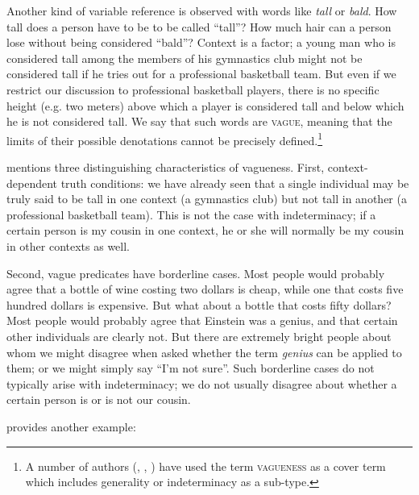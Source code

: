 Another kind of variable reference is observed with words like \textit{tall} or \textit{bald}. How tall does a person have to be to be called “tall”? How much hair can a person lose without being considered “bald”? Context is a factor; a young man who is considered tall among the members of his gymnastics club might not be considered tall if he tries out for a professional basketball team. But even if we restrict our discussion to professional basketball players, there is no specific height (e.g. two meters) above which a player is considered tall and below which he is not considered tall. We say that such words are \textsc{vague}, meaning that the limits of their possible denotations cannot be precisely defined.\footnote{A number of authors (\citealt{Kempson1977}, \citealt{Lakoff1970}, \citealt{Tuggy1993}) have used the term \textsc{vagueness} as a cover term which includes generality or indeterminacy as a sub-type.}



\citet{Kennedy2011} mentions three distinguishing characteristics of vagueness. First, context-dependent truth conditions: we have already seen that a single individual may be truly said to be tall in one context (a gymnastics club) but not tall in another (a professional basketball team). This is not the case with indeterminacy; if a certain person is my cousin in one context, he or she will normally be my cousin in other contexts as well.



Second, vague predicates have borderline cases. Most people would probably agree that a bottle of wine costing two dollars is cheap, while one that costs five hundred dollars is expensive. But what about a bottle that costs fifty dollars? Most people would probably agree that Einstein was a genius, and that certain other individuals are clearly not. But there are extremely bright people about whom we might disagree when asked whether the term \textit{genius} can be applied to them; or we might simply say “I’m not sure”. Such borderline cases do not typically arise with indeterminacy; we do not usually disagree about whether a certain person is or is not our cousin.



\citet{Gillon1990} provides another example:


